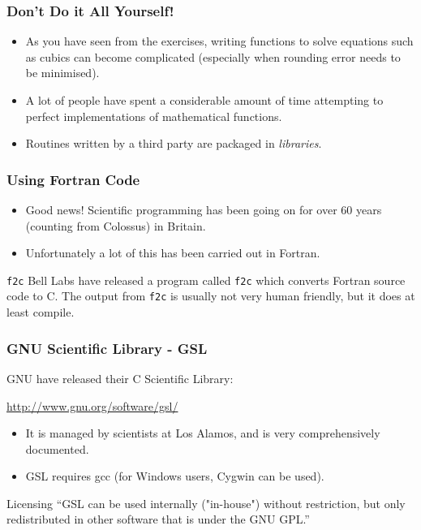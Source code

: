 \documentclass[table]{beamer}
\let\oldurl=\url
\renewcommand{\url}[1]{\textcolor{blue}{\oldurl{#1}}}
\begin{document}
\begin{frame}
\frametitle{Don't Do it All Yourself!}
\begin{itemize}
\item As you have seen from the exercises, writing functions to solve equations such as cubics can become complicated (especially when rounding error needs to be minimised).
\item A lot of people have spent a considerable amount of time attempting to perfect implementations of mathematical functions.
\item Routines written by a third party are packaged in \emph{libraries}.
\end{itemize}
\end{frame}

\begin{frame}
\frametitle{Using Fortran Code}
\begin{itemize}
\item Good news! Scientific programming has been going on for over 60 years (counting from Colossus) in Britain.
\item Unfortunately a lot of this has been carried out in Fortran.
\end{itemize}
\begin{block}{\tt f2c}
Bell Labs have released a program called {\tt f2c} which converts Fortran source code to C. The output from {\tt f2c} is usually not very human friendly, but it does at least compile.
\end{block}
\end{frame}

\begin{frame}
\frametitle{GNU Scientific Library - GSL}
GNU have released their C Scientific Library:
\begin{center}
\url{http://www.gnu.org/software/gsl/}
\end{center}

\begin{itemize}
\item It is managed by scientists at Los Alamos, and is very comprehensively documented.
\item GSL requires gcc (for Windows users, Cygwin can be used).
\end{itemize}

\begin{alertblock}{Licensing}
``GSL can be used internally ("in-house") without restriction, but only redistributed in other software that is under the GNU GPL.''
\end{alertblock}
\end{frame}
\end{document}
